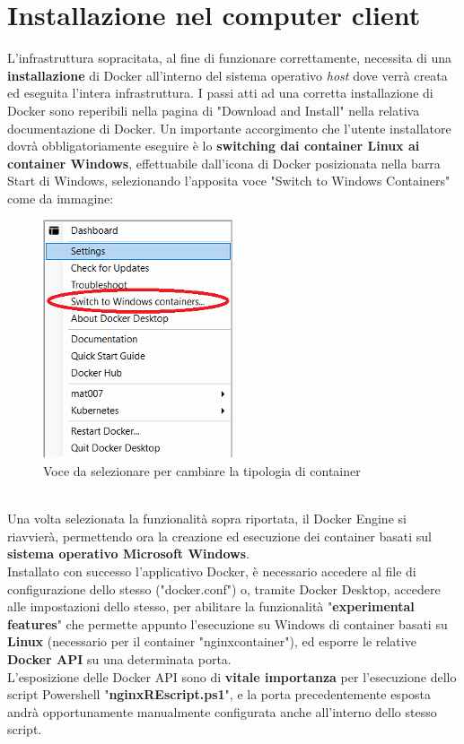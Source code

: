 \section{Installazione nel computer client}
L'infrastruttura sopracitata, al fine di funzionare correttamente, necessita di una \textbf{installazione} di Docker all'interno del sistema operativo \textit{host} dove verrà creata ed eseguita l'intera infrastruttura.
I passi atti ad una corretta installazione di Docker sono reperibili nella pagina di "Download and Install" nella relativa documentazione di Docker. Un importante accorgimento che l'utente installatore dovrà obbligatoriamente eseguire è lo \textbf{switching dai container Linux ai container Windows}, effettuabile dall'icona di Docker posizionata nella barra Start di Windows, selezionando l'apposita voce "Switch to Windows Containers" come da immagine:
\begin{figure}[!h]     
\centering 
    \includegraphics[width=0.2\columnwidth]{immagini/img/switch_windows_container} 
    \caption{Voce da selezionare per cambiare la tipologia di container}
\end{figure}\\
Una volta selezionata la funzionalità sopra riportata, il Docker Engine si riavvierà, permettendo ora la creazione ed esecuzione dei container basati sul \textbf{sistema operativo Microsoft Windows}.\\
Installato con successo l'applicativo Docker, è necessario accedere al file di configurazione dello stesso ("docker.conf") o, tramite Docker Desktop, accedere alle impostazioni dello stesso, per abilitare la funzionalità "\textbf{experimental features}" che permette appunto l'esecuzione su Windows di container basati su \textbf{Linux} (necessario per il container "nginxcontainer"), ed esporre le relative \textbf{\gls{Docker API}} su una determinata porta.\\
L'esposizione delle Docker API sono di \textbf{vitale importanza} per l'esecuzione dello script Powershell "\textbf{nginxREscript.ps1}", e la porta precedentemente esposta andrà opportunamente manualmente configurata anche all'interno dello stesso script.\\
